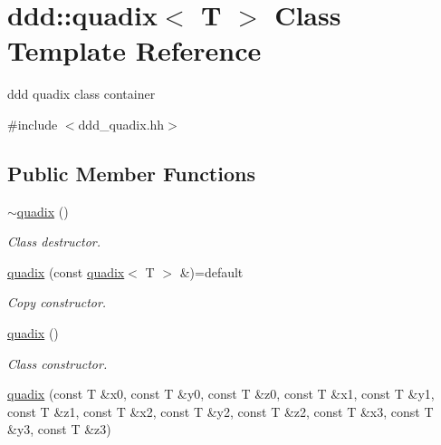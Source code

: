 \hypertarget{classddd_1_1quadix}{}\section{ddd\+:\+:quadix$<$ T $>$ Class Template Reference}
\label{classddd_1_1quadix}


ddd quadix class container  




{\ttfamily \#include $<$ddd\+\_\+quadix.\+hh$>$}

\subsection*{Public Member Functions}
\begin{DoxyCompactItemize}
\item 
\mbox{\label{classddd_1_1quadix_ad751f0c150c5f86e33cc1f10d85eb933}} 
\hyperlink{classddd_1_1quadix_ad751f0c150c5f86e33cc1f10d85eb933}{$\sim$quadix} ()
\begin{DoxyCompactList}\small\item\em Class destructor. \end{DoxyCompactList}\item 
\mbox{\label{classddd_1_1quadix_ae5890ee224844b4fe85b6284b7ea71c4}} 
\hyperlink{classddd_1_1quadix_ae5890ee224844b4fe85b6284b7ea71c4}{quadix} (const \hyperlink{classddd_1_1quadix}{quadix}$<$ T $>$ \&)=default
\begin{DoxyCompactList}\small\item\em Copy constructor. \end{DoxyCompactList}\item 
\mbox{\label{classddd_1_1quadix_afb86b4382b964e20bf2c88aa9085bc06}} 
\hyperlink{classddd_1_1quadix_afb86b4382b964e20bf2c88aa9085bc06}{quadix} ()
\begin{DoxyCompactList}\small\item\em Class constructor. \end{DoxyCompactList}\item 
\mbox{\label{classddd_1_1quadix_a0ae72a0bc622fc7cad5d6780c7af8e53}} 
\hyperlink{classddd_1_1quadix_a0ae72a0bc622fc7cad5d6780c7af8e53}{quadix} (const T \&x0, const T \&y0, const T \&z0, const T \&x1, const T \&y1, const T \&z1, const T \&x2, const T \&y2, const T \&z2, const T \&x3, const T \&y3, const T \&z3)

\end{DoxyCompactItemize}
